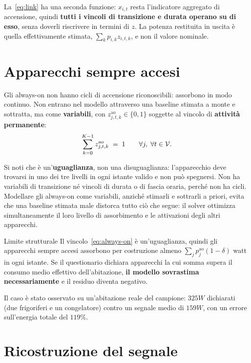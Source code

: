 La~\eqref{eq:link} ha una seconda funzione: $x_{i,t}$ resta l'indicatore aggregato di accensione,
quindi \textbf{tutti i vincoli di transizione e durata operano su di esso}, senza doverli
riscrivere in termini di $z$. La potenza restituita in uscita è quella effettivamente stimata,
$\sum_k p_{i,k} z_{i,t,k}$, e non il valore nominale.

\section{Apparecchi sempre accesi}
\label{sec:always-on}

Gli always-on non hanno cicli di accensione riconoscibili: assorbono in modo continuo. Non entrano
nel modello attraverso una baseline stimata a monte e sottratta, ma come \textbf{variabili}, con
$z^{\text{ao}}_{j,t,k} \in \{0,1\}$ soggette al vincolo di \textbf{attività permanente}:
\begin{equation}
  \sum_{k=0}^{K-1} z^{\text{ao}}_{j,t,k} \;=\; 1
  \qquad \forall j,\; \forall t \in \mathcal{V} .
  \label{eq:always-on}
\end{equation}

Si noti che è un'\textbf{uguaglianza}, non una disuguaglianza: l'apparecchio deve trovarsi in uno
dei tre livelli in ogni istante valido e non può spegnersi. Non ha variabili di transizione né
vincoli di durata o di fascia oraria, perché non ha cicli. Modellare gli always-on come variabili,
anziché stimarli e sottrarli a priori, evita che una baseline stimata male distorca tutto ciò che
segue: il solver ottimizza simultaneamente il loro livello di assorbimento e le attivazioni degli
altri apparecchi.

\begin{warnbox}{Limite strutturale}
Il vincolo~\eqref{eq:always-on} è un'uguaglianza, quindi gli apparecchi sempre accesi assorbono
per costruzione almeno $\sum_j p^{\text{ao}}_j (1-\delta)$ watt in ogni istante. Se il questionario
dichiara apparecchi la cui somma supera il consumo medio effettivo dell'abitazione, \textbf{il
modello sovrastima necessariamente} e il residuo diventa negativo.

Il caso è stato osservato su un'abitazione reale del campione: $325\unit{W}$ dichiarati
(due frigoriferi e un congelatore) contro un segnale medio di $159\unit{W}$, con un errore
sull'energia totale del $119\%$.
\end{warnbox}

\section{Ricostruzione del segnale}

